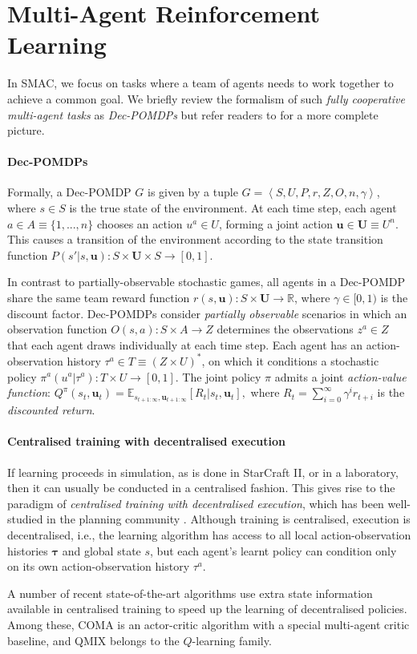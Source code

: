 \section{Multi-Agent Reinforcement Learning}

In SMAC, we focus on tasks where a team of agents needs to work together to achieve a common goal. We briefly review the formalism of such \textit{fully cooperative multi-agent tasks} as \textit{Dec-POMDPs} but refer readers to \citet{oliehoek_concise_2016} for a more complete picture.
\paragraph*{Dec-POMDPs} Formally, a Dec-POMDP $G$ is given by a tuple 
$G=\left\langle S,U,P,r,Z,O,n,\gamma\right\rangle$, where  $s \in S$ is the true state of the environment. At each time step, each agent $a \in A \equiv \{1,...,n\}$ chooses an action $u^a\in U$, forming a joint action $\mathbf{u}\in\mathbf{U}\equiv U^n$. 
This causes a transition of the environment according to the state transition function $P(s'|s,\mathbf{u}):S\times\mathbf{U}\times S\rightarrow [0,1]$. 

In contrast to partially-observable stochastic games, all agents in a Dec-POMDP share the same team reward function $r(s,\mathbf{u}):S\times\mathbf{U}\rightarrow\mathbb{R}$, where $\gamma\in[0,1)$ is the discount factor. 
Dec-POMDPs consider \textit{partially observable} scenarios in which an observation function $O(s,a):S\times A\rightarrow Z$ determines the observations $z^a\in Z$ that each agent draws individually at each time step. 
Each agent has an action-observation history $\tau^a\in T\equiv(Z\times U)^*$, on which it conditions a stochastic policy $\pi^a(u^a|\tau^a):T\times U\rightarrow [0,1]$. The joint policy $\pi$ admits a joint \textit{action-value function}: $Q^\pi(s_t, \mathbf{u}_t)=\mathbb{E}_{s_{t+1:\infty},\mathbf{u}_{t+1:\infty}} \left[R_t|s_t,\mathbf{u}_t\right],$ where $R_t=\sum^{\infty}_{i=0}\gamma^ir_{t+i}$ is the \textit{discounted return}.

\paragraph*{Centralised training with decentralised execution}
If learning proceeds in simulation, as is done in StarCraft II, or in a laboratory, then it can usually be conducted in a centralised fashion. This gives rise to the paradigm of \textit{centralised training with decentralised execution}, which has been well-studied in the planning community \cite{oliehoek_optimal_2008,kraemer_multi-agent_2016}. Although training is centralised, execution is decentralised, i.e., the 
learning algorithm has access to all local action-observation histories 
$\boldsymbol{\tau}$ and global state $s$, but each agent's learnt policy can 
condition only on its own action-observation history $\tau^a$. 

A number of recent state-of-the-art algorithms use extra state information available in centralised training to speed up the learning of decentralised policies. Among these, COMA \cite{foerster_counterfactual_2017} is an actor-critic algorithm with a special multi-agent critic baseline, and QMIX \cite{rashid_qmix:_2018} belongs to the $Q$-learning family.
